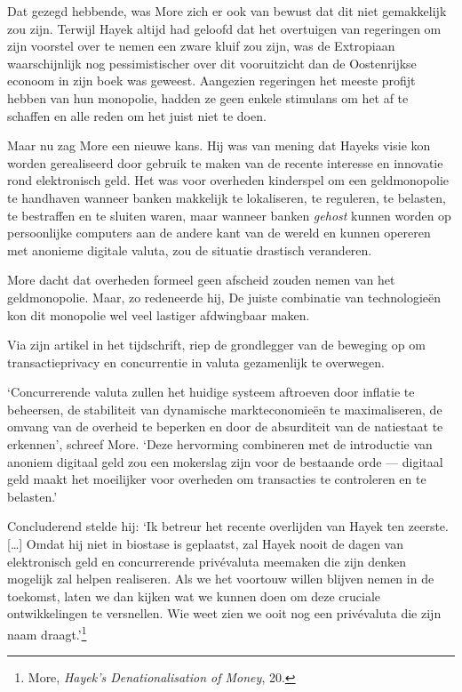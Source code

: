 \documentclass[
  a5paper,
  smalldemyvopaper,11pt,twoside,onecolumn,openright,extrafontsizes,
hidelinks]{memoir}
\begin{document}
Dat gezegd hebbende, was More zich er ook van bewust dat dit niet
gemakkelijk zou zijn. Terwijl Hayek altijd had geloofd dat het
overtuigen van regeringen om zijn voorstel over te nemen een zware kluif
zou zijn, was de Extropiaan waarschijnlijk nog pessimistischer over dit
vooruitzicht dan de Oostenrijkse econoom in zijn boek was geweest.
Aangezien regeringen het meeste profijt hebben van hun monopolie, hadden
ze geen enkele stimulans om het af te schaffen en alle reden om het
juist niet te doen.

Maar nu zag More een nieuwe kans. Hij was van mening dat Hayeks visie
kon worden gerealiseerd door gebruik te maken van de recente interesse
en innovatie rond elektronisch geld. Het was voor overheden kinderspel
om een geldmonopolie te handhaven wanneer banken makkelijk te
lokaliseren, te reguleren, te belasten, te bestraffen en te sluiten
waren, maar wanneer banken \emph{gehost} kunnen worden op persoonlijke
computers aan de andere kant van de wereld en kunnen opereren met
anonieme digitale valuta, zou de situatie drastisch veranderen.

More dacht dat overheden formeel geen afscheid zouden nemen van het
geldmonopolie. Maar, zo redeneerde hij, De juiste combinatie van
technologieën kon dit monopolie wel veel lastiger afdwingbaar maken.

Via zijn artikel in het tijdschrift, riep de grondlegger van de beweging
op om transactieprivacy en concurrentie in valuta gezamenlijk te
overwegen.

`Concurrerende valuta zullen het huidige systeem aftroeven door inflatie
te beheersen, de stabiliteit van dynamische markteconomieën te
maximaliseren, de omvang van de overheid te beperken en door de
absurditeit van de natiestaat te erkennen', schreef More. `Deze
hervorming combineren met de introductie van anoniem digitaal geld zou
een mokerslag zijn voor de bestaande orde --- digitaal geld maakt het
moeilijker voor overheden om transacties te controleren en te belasten.'

Concluderend stelde hij: `Ik betreur het recente overlijden van Hayek
ten zeerste. {[}\ldots{]} Omdat hij niet in biostase is geplaatst, zal
Hayek nooit de dagen van elektronisch geld en concurrerende privévaluta
meemaken die zijn denken mogelijk zal helpen realiseren. Als we het
voortouw willen blijven nemen in de toekomst, laten we dan kijken wat we
kunnen doen om deze cruciale ontwikkelingen te versnellen. Wie weet zien
we ooit nog een privévaluta die zijn naam draagt.'\footnote{More,
  \emph{Hayek's Denationalisation of Money}, 20.}
\end{document}
